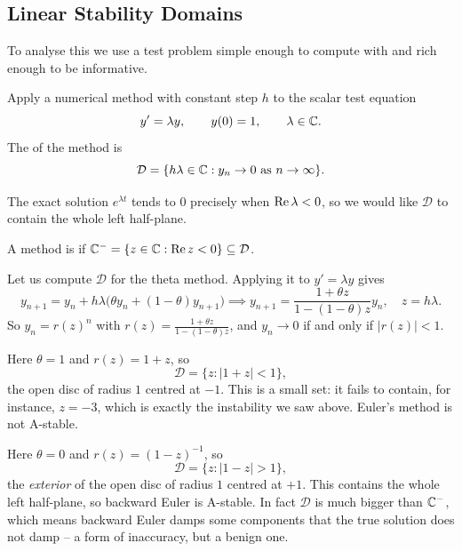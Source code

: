 \documentclass[a4paper]{scrartcl}
\providecommand{\abs}[1]{\left\lvert#1\right\rvert}
\renewcommand{\abs}[1]{\left\lvert#1\right\rvert}
\begin{document}
\subsection{Linear Stability Domains}

To analyse this we use a test problem simple enough to compute with and rich enough to be informative.

\begin{definition}
  Apply a numerical method with constant step $h$ to the scalar test equation
  $$
  y' = \lambda y, \qquad y(0) = 1, \qquad \lambda \in \mathbb{C} .
  $$
  The  of the method is
  $$
  \mathcal{D} = \{ h\lambda \in \mathbb{C} : y_n \to 0 \text{ as } n \to \infty\}.
  $$
\end{definition}

The exact solution $e^{\lambda t}$ tends to $0$ precisely when $\operatorname{Re}\lambda < 0$, so we would like $\mathcal{D}$ to contain the whole left half-plane.

\begin{definition}[A-stability]
  A method is  if $\mathbb{C}^- = \{z \in \mathbb{C} : \operatorname{Re} z < 0\} \subseteq \mathcal{D}$.
\end{definition}

Let us compute $\mathcal{D}$ for the theta method. Applying it to $y' = \lambda y$ gives
$$
y_{n+1} = y_n + h\lambda\big(\theta y_n + (1-\theta)y_{n+1}\big) \implies y_{n+1} = \frac{1 + \theta z}{1 - (1-\theta)z}y_n, \quad z = h\lambda .
$$
So $y_n = r(z)^n$ with $r(z) = \frac{1+\theta z}{1 - (1-\theta)z}$, and $y_n \to 0$ if and only if $\abs{r(z)} < 1$.

\begin{example}
  Here $\theta = 1$ and $r(z) = 1 + z$, so
  $$
  \mathcal{D} = \{z : \abs{1 + z} < 1\},
  $$
  the open disc of radius $1$ centred at $-1$. This is a small set: it fails to contain, for instance, $z = -3$, which is exactly the instability we saw above. Euler's method is not A-stable.
\end{example}

\begin{example}
  Here $\theta = 0$ and $r(z) = (1-z)^{-1}$, so
  $$
  \mathcal{D} = \{z : \abs{1 - z} > 1\},
  $$
  the \emph{exterior} of the open disc of radius $1$ centred at $+1$. This contains the whole left half-plane, so backward Euler is A-stable. In fact $\mathcal{D}$ is much bigger than $\mathbb{C}^-$, which means backward Euler damps some components that the true solution does not damp -- a form of inaccuracy, but a benign one.
\end{example}
\end{document}

